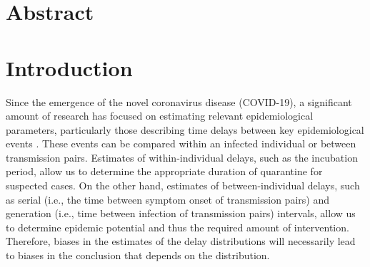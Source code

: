 \documentclass[12pt]{article}
\date{\today}
\begin{document}
\begin{flushleft}{
	\Large
	\textbf{}
}
\end{flushleft}

\section*{Abstract}

\pagebreak


\section{Introduction}

Since the emergence of the novel coronavirus disease (COVID-19), a significant amount of research has focused on estimating relevant epidemiological parameters, particularly those describing time delays between key epidemiological events \citep{backer2020incubation, du2020serial, ganyani2020estimating, lauer2020incubation, li2020early, linton2020incubation, nishiura2020serial, tian2020characteristics, zhao2020estimating}.
These events can be compared within an infected individual or between transmission pairs.
Estimates of within-individual delays, such as the incubation period, allow us to determine the appropriate duration of quarantine for suspected cases.
On the other hand, estimates of between-individual delays, such as serial (i.e., the time between symptom onset of transmission pairs) and generation (i.e., time between infection of transmission pairs) intervals, allow us to determine epidemic potential and thus the required amount of intervention.
Therefore, biases in the estimates of the delay distributions will necessarily lead to biases in the conclusion that depends on the distribution.
\end{document}
